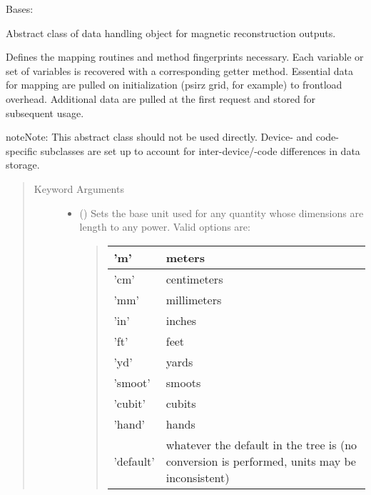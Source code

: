 \documentclass[letterpaper,10pt,english]{sphinxmanual}
\begin{document}

\begin{fulllineitems}
\label{\detokenize{eqtools:eqtools.core.Equilibrium}}
Bases: 

Abstract class of data handling object for magnetic reconstruction outputs.

Defines the mapping routines and method fingerprints necessary. Each
variable or set of variables is recovered with a corresponding getter method.
Essential data for mapping are pulled on initialization (psirz grid, for
example) to frontload overhead. Additional data are pulled at the first
request and stored for subsequent usage.

\begin{sphinxadmonition}{note}{Note:}
This abstract class should not be used directly. Device- and code-
specific subclasses are set up to account for inter-device/-code
differences in data storage.
\end{sphinxadmonition}
\begin{quote}\begin{description}
\item[{Keyword Arguments}] \leavevmode\begin{itemize}
\item {} 
 () \textendash{} 
Sets the base unit used for any quantity whose
dimensions are length to any power. Valid options are:
\begin{quote}


\begin{savenotes}\sphinxattablestart
\centering
\begin{tabulary}{\linewidth}[t]{|T|T|}
\hline

’m’
&
meters
\\
\hline
’cm’
&
centimeters
\\
\hline
’mm’
&
millimeters
\\
\hline
’in’
&
inches
\\
\hline
’ft’
&
feet
\\
\hline
’yd’
&
yards
\\
\hline
’smoot’
&
smoots
\\
\hline
’cubit’
&
cubits
\\
\hline
’hand’
&
hands
\\
\hline
’default’
&
whatever the default in the tree is (no conversion is performed, units may be inconsistent)
\\
\hline
\end{tabulary}
\par
\sphinxattableend\end{savenotes}
\end{quote}


\end{itemize}
\end{description}
\end{quote}
\end{fulllineitems}
\end{document}
